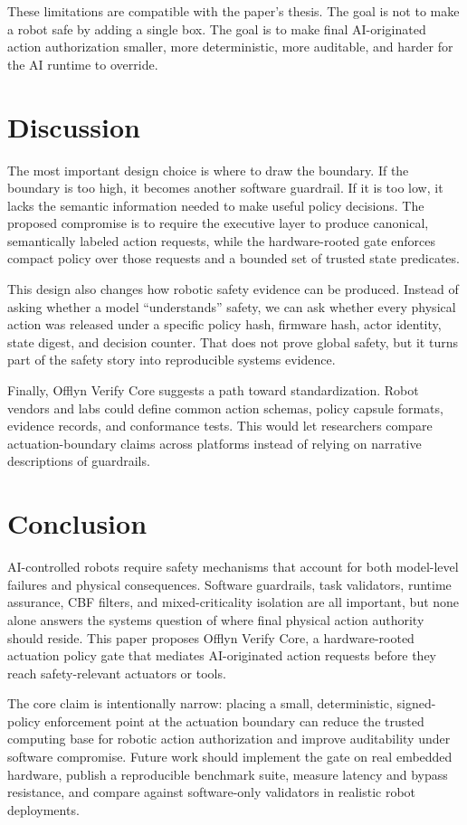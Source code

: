 \documentclass[10pt]{article}
\newcommand{\ovc}{Offlyn Verify Core\xspace}
\begin{document}
These limitations are compatible with the paper's thesis. The goal is not to make a robot safe by adding a single box. The goal is to make final AI-originated action authorization smaller, more deterministic, more auditable, and harder for the AI runtime to override.

\section{Discussion}

The most important design choice is where to draw the boundary. If the boundary is too high, it becomes another software guardrail. If it is too low, it lacks the semantic information needed to make useful policy decisions. The proposed compromise is to require the executive layer to produce canonical, semantically labeled action requests, while the hardware-rooted gate enforces compact policy over those requests and a bounded set of trusted state predicates.

This design also changes how robotic safety evidence can be produced. Instead of asking whether a model ``understands'' safety, we can ask whether every physical action was released under a specific policy hash, firmware hash, actor identity, state digest, and decision counter. That does not prove global safety, but it turns part of the safety story into reproducible systems evidence.

Finally, \ovc suggests a path toward standardization. Robot vendors and labs could define common action schemas, policy capsule formats, evidence records, and conformance tests. This would let researchers compare actuation-boundary claims across platforms instead of relying on narrative descriptions of guardrails.

\section{Conclusion}

AI-controlled robots require safety mechanisms that account for both model-level failures and physical consequences. Software guardrails, task validators, runtime assurance, CBF filters, and mixed-criticality isolation are all important, but none alone answers the systems question of where final physical action authority should reside. This paper proposes \ovc, a hardware-rooted actuation policy gate that mediates AI-originated action requests before they reach safety-relevant actuators or tools.

The core claim is intentionally narrow: placing a small, deterministic, signed-policy enforcement point at the actuation boundary can reduce the trusted computing base for robotic action authorization and improve auditability under software compromise. Future work should implement the gate on real embedded hardware, publish a reproducible benchmark suite, measure latency and bypass resistance, and compare against software-only validators in realistic robot deployments.
\end{document}
